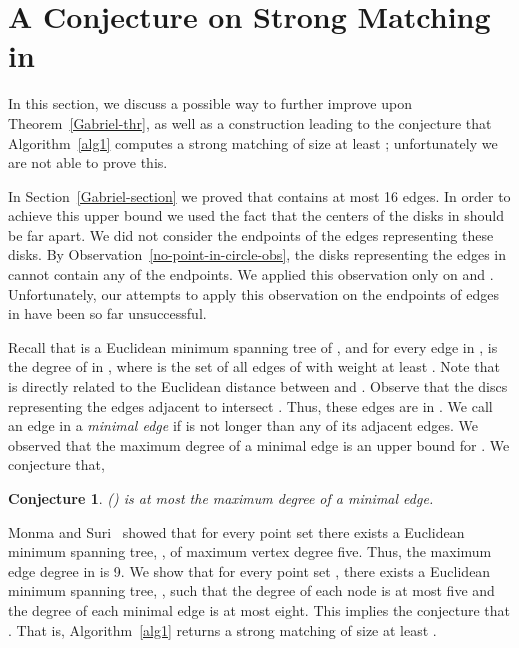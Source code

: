 \documentclass[11pt,a4paper]{article}
\newcommand{\Inf}[1]{\text{Inf}(#1)}
\newtheorem{conjecture}{Conjecture}
\begin{document}
\section{A Conjecture on Strong Matching in }
\label{conjecture-section}
In this section, we discuss a possible way to further improve upon Theorem~\ref{Gabriel-thr}, as well as
a construction leading to the conjecture that Algorithm~\ref{alg1} computes a strong matching of size at least ; unfortunately we are not able to prove this. 

In Section~\ref{Gabriel-section} we proved that  contains at most 16 edges. In order to achieve this upper bound we used the fact that the centers of the disks in  should be far apart. We did not consider the endpoints of the edges representing these disks. By Observation~\ref{no-point-in-circle-obs}, the disks representing the edges in  cannot contain any of the endpoints. We applied this observation only on  and . Unfortunately, our attempts to apply this observation on the endpoints of edges in  have been so far unsuccessful.

Recall that  is a Euclidean minimum spanning tree of , and for every edge  in ,  is the degree of  in , where  is the set of all edges of  with weight at least . Note that  is directly related to the Euclidean distance between  and . Observe that the discs representing the edges adjacent to  intersect . Thus, these edges are in . 
We call an edge  in  a {\em minimal edge} if  is not longer than any of its adjacent edges. We observed that the maximum degree of a minimal edge is an upper bound for . We conjecture that,

\begin{conjecture}
{\em \Inf{}} is at most the maximum degree of a minimal edge.
\end{conjecture}

Monma and Suri~\cite{Monma1992} showed that for every point set  there exists a Euclidean minimum spanning tree, , of maximum vertex degree five. Thus, the maximum edge degree in  is 9. We show that for every point set , there exists a Euclidean minimum spanning tree, , such that the degree of each node is at most five and the degree of each minimal edge is at most eight. This implies the conjecture that . That is, Algorithm~\ref{alg1} returns a strong matching of size at least .
\end{document}
